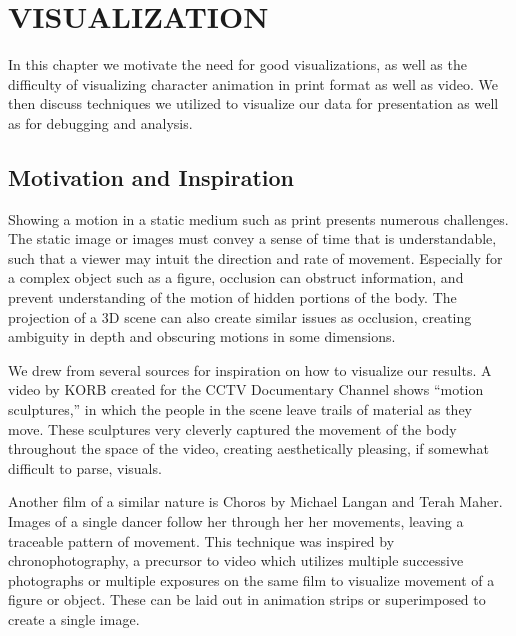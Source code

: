 
 
\chapter{VISUALIZATION}
\label{chapter:visualization}
In this chapter we motivate the need for good visualizations, as well as the difficulty of visualizing character animation in print format as well as video.  We then discuss techniques we utilized to visualize our data for presentation as well as for debugging and analysis.

\section{Motivation and Inspiration}
\label{section:vis_insp}
Showing a motion in a static medium such as print presents numerous challenges.  The static image or images must convey a sense of time that is understandable, such that a viewer may intuit the direction and rate of movement.  Especially for a complex object such as a figure, occlusion can obstruct information, and prevent understanding of the motion of hidden portions of the body.  The projection of a 3D scene can also create similar issues as occlusion, creating ambiguity in depth and obscuring motions in some dimensions.

We drew from several sources for inspiration on how to visualize our results.  A video by KORB created for the CCTV Documentary Channel shows ``motion sculptures,'' in which the people in the scene leave trails of material as they move.  These sculptures very cleverly captured the movement of the body throughout the space of the video, creating aesthetically pleasing, if somewhat difficult to parse, visuals.

Another film of a similar nature is Choros by Michael Langan and Terah Maher.  Images of a single dancer follow her through her her movements, leaving a traceable pattern of movement.  This technique was inspired by chronophotography, a precursor to video which utilizes multiple successive photographs or multiple exposures on the same film to visualize movement of a figure or object.  These can be laid out in animation strips or superimposed to create a single image.

